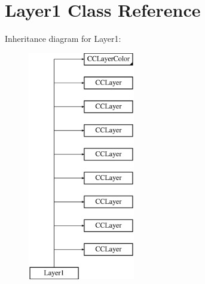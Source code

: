 \hypertarget{interface_layer1}{\section{Layer1 Class Reference}
\label{interface_layer1}
}
Inheritance diagram for Layer1\-:\begin{figure}[H]
\begin{center}
\leavevmode
\includegraphics[height=10.000000cm]{interface_layer1}
\end{center}
\end{figure}
